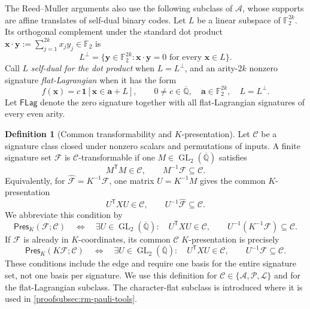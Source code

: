 \documentclass[11pt,letterpaper,onecolumn]{article}
\theoremstyle{plain}
\theoremstyle{definition}
\newtheorem{definition}[definition]{Definition}
\theoremstyle{remark}
\newcommand{\AlgNums}{\overline{\mathbb Q}}
\newcommand{\Ftwo}{\mathbb F_2}
\newcommand{\cF}{\mathcal F}
\newcommand{\cA}{\mathscr A}
\newcommand{\cP}{\mathscr P}
\newcommand{\cL}{\mathscr L}
\newcommand{\cC}{\mathscr C}
\newcommand{\PresK}{\mathsf{Pres}_{K}}
\newcommand{\FLag}{\mathsf{FLag}}
\newcommand{\GL}{\operatorname{GL}}
\newcommand{\one}{\mathbf 1}
\begin{document}
The Reed--Muller arguments also use the following subclass of \(\cA\),
whose supports are affine translates of self-dual binary codes.
Let \(L\) be a linear subspace of \(\Ftwo^{2k}\).  Its orthogonal complement
under the standard dot product
\({\mathbf{x}}\mathbin{\cdot}{\mathbf{y}}:=\sum_{j=1}^{2k}x_jy_j\in\Ftwo\) is
\[
 L^\perp
 =
 \{{\mathbf{y}}\in\Ftwo^{2k}:{\mathbf{x}}\mathbin{\cdot}{\mathbf{y}}=0
     \text{ for every }{\mathbf{x}}\in L\}.
\]
Call \(L\) \emph{self-dual for the dot product} when \(L=L^\perp\), and an arity-\(2k\)
nonzero signature \emph{flat-Lagrangian} when it has the form
\begin{equation*}
  f({\mathbf{x}})=c\,\one[{\mathbf{x}}\in {\mathbf{a}}+L],\qquad
  0\ne c\in\AlgNums,\quad {\mathbf{a}}\in\Ftwo^{2k},\quad L=L^\perp.
\end{equation*}
Let \(\FLag\) denote the zero signature together with all flat-Lagrangian
signatures of every even arity.
\begin{definition}[Common transformability and \(K\)-presentation]
\label{def:common-transformability}
\label{def:common-K-presentation}
Let \(\cC\) be a signature class closed under nonzero scalars and permutations of inputs.  A
finite signature set \(\cF\) is \(\cC\)-transformable if one
\(M\in\GL_2(\AlgNums)\) satisfies
\begin{equation*}
 M^{\mathsf T}M\in\cC,\qquad M^{-1}\cF\subseteq\cC.
\end{equation*}
Equivalently, for \(\widehat{\cF}=K^{-1}\cF\), one matrix
\(U=K^{-1}M\) gives the common \(K\)-presentation
\begin{equation*}
 U^{\mathsf T}XU\in\cC,\qquad U^{-1}\widehat{\cF}\subseteq\cC.
\end{equation*}
We abbreviate this condition by
\begin{equation}
 \PresK(\cF;\cC)
 \quad\Longleftrightarrow\quad
 \exists U\in\GL_2(\AlgNums):
 \quad U^{\mathsf T}XU\in\cC,
 \qquad U^{-1}(K^{-1}\cF)\subseteq\cC.
 \label{eq:common-K-presentation-predicate}
\end{equation}
If \(\cF\) is already in \(K\)-coordinates, its common
\(\cC\) \(K\)-presentation is precisely
\[
 \PresK(K\cF;\cC)\quad\Longleftrightarrow\quad
 \exists U\in\GL_2(\AlgNums):\quad
 U^{\mathsf T}XU\in\cC,\qquad U^{-1}\cF\subseteq\cC.
\]
These conditions include the edge and require one basis
for the entire signature set, not one basis per signature.  We use this definition
for \(\cC\in\{\cA,\cP,\cL\}\) and for the flat-Lagrangian subclass.
The character-flat subclass is introduced where it is used in
\cref{proofsubsec:rm-pauli-tools}.
\end{definition}
\end{document}
